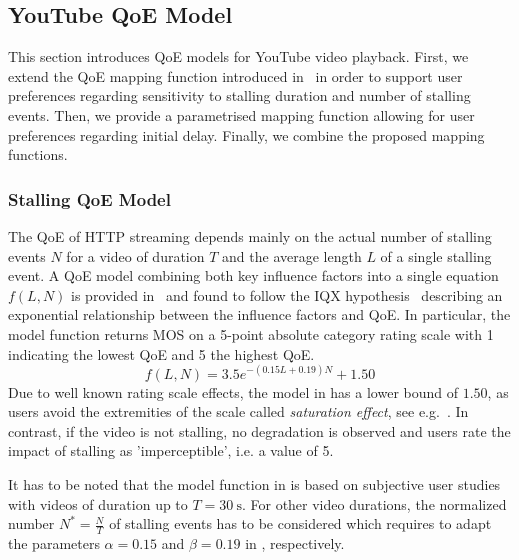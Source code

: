 \subsection{YouTube QoE Model}\label{sec:application:qoe_user_behaviour:typical_user_scenarios:youtube_qoe}
This section introduces \gls{QoE} models for YouTube video playback.
First, we extend the \gls{QoE} mapping function introduced in~\cite{Hossfeld2013c} in order to support user preferences regarding sensitivity to stalling duration and number of stalling events.
Then, we provide a parametrised mapping function allowing for user preferences regarding initial delay.
Finally, we combine the proposed mapping functions.

\subsubsection*{Stalling QoE Model}\label{sec:application:qoe_user_behaviour:typical_user_scenarios:youtube_qoe:stalling}
The \gls{QoE} of \gls{HTTP} streaming depends mainly on the actual number of stalling events \(N\) for a video of duration \(T\) and the average length \(L\) of a single stalling event.
A \gls{QoE} model combining both key influence factors into a single equation \(f(L,N)\) is provided in~\cite{Hossfeld2013c} and found to follow the IQX hypothesis~\cite{Fiedler2010} describing an exponential relationship between the influence factors and \gls{QoE}.
In particular, the model function returns \gls{MOS} on a 5-point absolute category rating scale with 1 indicating the lowest \gls{QoE} and 5 the highest \gls{QoE}. 
\begin{equation}
 f(L,N) = 3.5 e^{-(0.15L + 0.19)N}+1.50
\label{eq:application:qoe_user_behaviour:typical_user_scenarios:youtube_qoe:stalling:original_model}
\end{equation}
Due to well known rating scale effects, the model in  has a lower bound of \(1.50\), as users avoid the extremities of the scale called \emph{saturation effect}, see e.g.~\cite{Moller2000}.
In contrast, if the video is not stalling, no degradation is observed and users rate the impact of stalling as 'imperceptible', i.e. a value of 5.

It has to be noted that the model function in  is based on subjective user studies with videos of duration up to \(T=\SI{30}{\second}\).
For other video durations, the normalized number \(N^*=\frac{N}{T}\) of stalling events has to be considered which requires to adapt the parameters \(\alpha=0.15\) and \(\beta=0.19\) in , respectively. 

